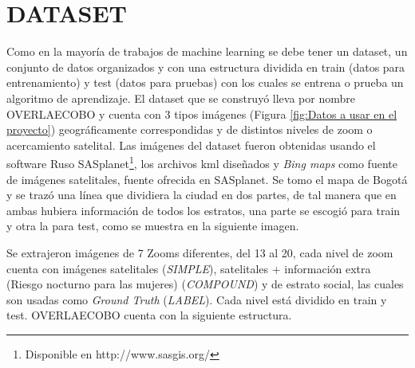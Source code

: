 
 \section{DATASET}
 Como en la mayoría de trabajos de machine learning se debe tener un dataset, un conjunto de datos organizados y con una estructura dividida en train (datos para entrenamiento) y test (datos para pruebas) con los cuales se entrena o prueba un algoritmo de aprendizaje. El dataset que se construyó lleva por nombre OVERLAECOBO y cuenta con 3 tipos imágenes (Figura \ref{fig:Datos a usar en el proyecto}) geográficamente correspondidas y de distintos niveles de zoom o acercamiento satelital. Las imágenes del dataset fueron obtenidas usando el software Ruso SASplanet\footnote[14]{Disponible en http://www.sasgis.org/}, los archivos kml diseñados y \textit{Bing maps} como fuente de imágenes satelitales, fuente ofrecida en SASplanet. Se tomo el mapa de Bogotá y se trazó una línea que dividiera la ciudad en dos partes, de tal manera que en ambas hubiera información de todos los estratos, una parte se escogió para train y otra la para test, como se muestra en la siguiente imagen.
 
 
  Se extrajeron imágenes de 7 Zooms diferentes, del 13 al 20,  cada nivel de zoom cuenta con imágenes satelitales (\textit{SIMPLE}), satelitales + información extra (Riesgo nocturno para las mujeres) (\textit{COMPOUND}) y de estrato social, las cuales son usadas como \textit{Ground Truth} (\textit{LABEL}). Cada nivel está dividido en train y test. OVERLAECOBO cuenta con la siguiente estructura.
 
 
